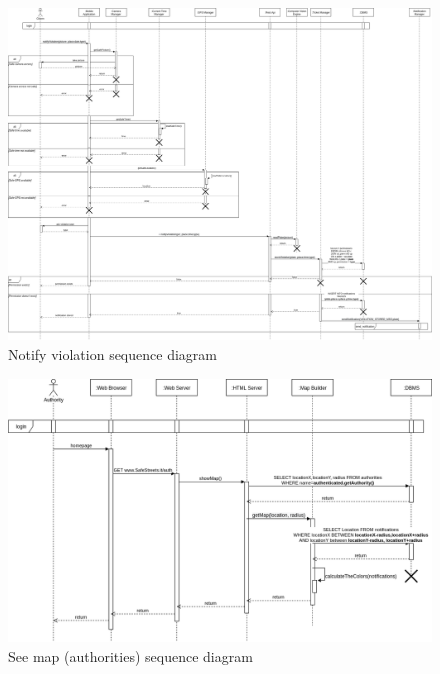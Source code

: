 \documentclass{article}
\begin{document}
	\begin{figure}[h]
		\includegraphics[width=\linewidth]{images/Notify_Violation_sequence_diagram.png}
		\caption{Notify violation sequence diagram}
	\end{figure}	
	\begin{figure}[h]
	\includegraphics[width=\linewidth]{images/See_HighlightedMapAuthorities_sequence_diagram.png}
		\caption{See map (authorities) sequence diagram}
	\end{figure}
\end{document}
